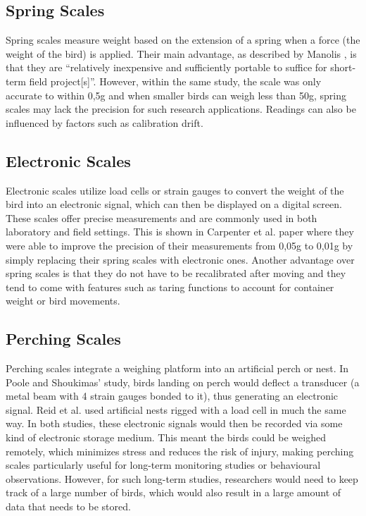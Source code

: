 \documentclass[class=report,11pt,crop=false]{standalone}
\begin{document}
\subsection{Spring Scales}
Spring scales measure weight based on the extension of a spring when a force (the weight of the bird) is applied. Their main advantage, as described by Manolis \cite{manoils2024simple}, is that they are “relatively inexpensive and sufficiently portable to suffice for short-term field project[s]”. However, within the same study, the scale was only accurate to within 0,5g and when smaller birds can weigh less than 50g, spring scales may lack the precision for such research applications. Readings can also be influenced by factors such as calibration drift.

\subsection{Electronic Scales}
Electronic scales utilize load cells or strain gauges to convert the weight of the bird into an electronic signal, which can then be displayed on a digital screen. These scales offer precise measurements and are commonly used in both laboratory and field settings. This is shown in Carpenter et al. \cite{carpenter1983weight} paper where they were able to improve the precision of their measurements from 0,05g to 0,01g by simply replacing their spring scales with electronic ones. Another advantage over spring scales is that they do not have to be recalibrated after moving \cite{carpenter1983weight} and they tend to come with features such as taring functions to account for container weight or bird movements.

\subsection{Perching Scales}
Perching scales integrate a weighing platform into an artificial perch or nest. In Poole and Shoukimas’ \cite{poole1982scale} study, birds landing on perch would deflect a transducer (a metal beam with 4 strain gauges bonded to it), thus generating an electronic signal. Reid et al. \cite{reid1999measurement} used artificial nests rigged with a load cell in much the same way. In both studies, these electronic signals would then be recorded via some kind of electronic storage medium. This meant the birds could be weighed remotely, which minimizes stress and reduces the risk of injury, making perching scales particularly useful for long-term monitoring studies or behavioural observations. However, for such long-term studies, researchers would need to keep track of a large number of birds, which would also result in a large amount of data that needs to be stored.
\end{document}
